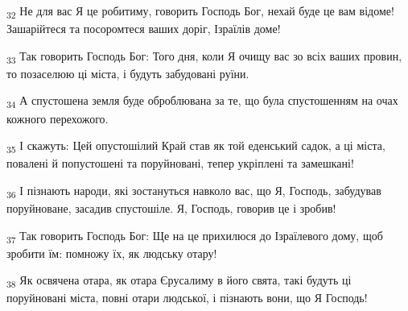 \begin{tcolorbox}
\textsubscript{32} Не для вас Я це робитиму, говорить Господь Бог, нехай буде це вам відоме! Зашарійтеся та посоромтеся ваших доріг, Ізраїлів доме!
\end{tcolorbox}
\begin{tcolorbox}
\textsubscript{33} Так говорить Господь Бог: Того дня, коли Я очищу вас зо всіх ваших провин, то позаселюю ці міста, і будуть забудовані руїни.
\end{tcolorbox}
\begin{tcolorbox}
\textsubscript{34} А спустошена земля буде оброблювана за те, що була спустошенням на очах кожного перехожого.
\end{tcolorbox}
\begin{tcolorbox}
\textsubscript{35} І скажуть: Цей опустошілий Край став як той еденський садок, а ці міста, повалені й попустошені та поруйновані, тепер укріплені та замешкані!
\end{tcolorbox}
\begin{tcolorbox}
\textsubscript{36} І пізнають народи, які зостануться навколо вас, що Я, Господь, забудував поруйноване, засадив спустошіле. Я, Господь, говорив це і зробив!
\end{tcolorbox}
\begin{tcolorbox}
\textsubscript{37} Так говорить Господь Бог: Ще на це прихилюся до Ізраїлевого дому, щоб зробити їм: помножу їх, як людську отару!
\end{tcolorbox}
\begin{tcolorbox}
\textsubscript{38} Як освячена отара, як отара Єрусалиму в його свята, такі будуть ці поруйновані міста, повні отари людської, і пізнають вони, що Я Господь!
\end{tcolorbox}
